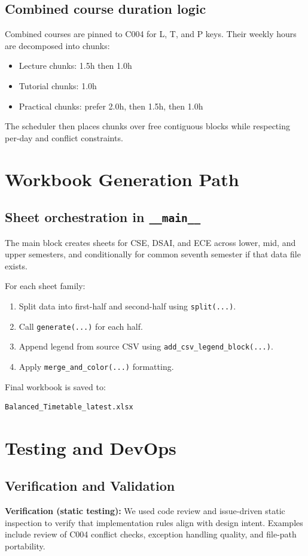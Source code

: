 \documentclass[12pt,a4paper]{article}
\begin{document}
\subsection{Combined course duration logic}
Combined courses are pinned to C004 for L, T, and P keys. Their weekly hours are decomposed into chunks:
\begin{itemize}[leftmargin=1.2cm]
  \item Lecture chunks: 1.5h then 1.0h
  \item Tutorial chunks: 1.0h
  \item Practical chunks: prefer 2.0h, then 1.5h, then 1.0h
\end{itemize}
The scheduler then places chunks over free contiguous blocks while respecting per-day and conflict constraints.

\section{Workbook Generation Path}

\subsection{Sheet orchestration in \texttt{\_\_main\_\_}}
The main block creates sheets for CSE, DSAI, and ECE across lower, mid, and upper semesters, and conditionally for common seventh semester if that data file exists.

For each sheet family:
\begin{enumerate}[leftmargin=1.2cm]
  \item Split data into first-half and second-half using \texttt{split(...)}.
  \item Call \texttt{generate(...)} for each half.
  \item Append legend from source CSV using \texttt{add\_csv\_legend\_block(...)}.
  \item Apply \texttt{merge\_and\_color(...)} formatting.
\end{enumerate}

Final workbook is saved to:
\begin{verbatim}
Balanced_Timetable_latest.xlsx
\end{verbatim}

\section{Testing and DevOps}

\subsection{Verification and Validation}
\textbf{Verification (static testing):}
We used code review and issue-driven static inspection to verify that implementation rules align with design intent. Examples include review of C004 conflict checks, exception handling quality, and file-path portability.
\end{document}
